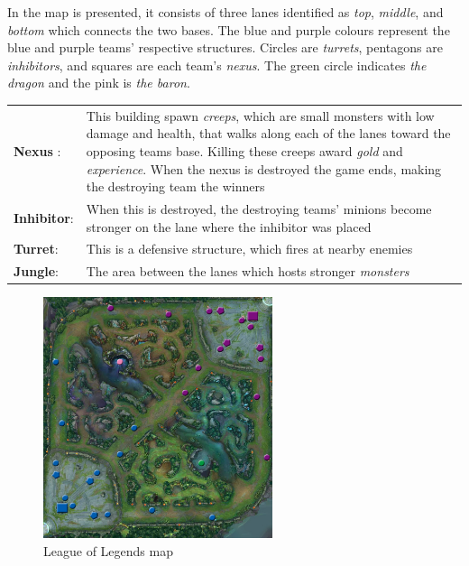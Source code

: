 In  the map is presented, it consists of three lanes identified as \emph{top}, \emph{middle}, and \emph{bottom} which connects the two bases. The blue and purple colours represent the blue and purple teams' respective structures. Circles are \emph{turrets}, pentagons are \emph{inhibitors}, and squares are each team's \emph{nexus}. The green circle indicates \emph{the dragon} and the pink is \emph{the baron}.

\begin{table}[!h]
  \begin{tabular}{l p{13cm}}
    \textbf{Nexus} : & This building spawn \emph{creeps}, which are small monsters with low damage and health, that walks along each of the lanes toward the opposing teams base. Killing these creeps award \emph{gold} and \emph{experience}. When the nexus is destroyed the game ends, making the destroying team the winners\\
    \textbf{Inhibitor}: & When this is destroyed, the destroying teams' minions become stronger on the lane where the inhibitor was placed\\
    \textbf{Turret}: & This is a defensive structure, which fires at nearby enemies\\
    \textbf{Jungle}: & The area between the lanes which hosts stronger \emph{monsters}\\
  \end{tabular}
\end{table}

\begin{figure}[!htb]
  \centering
    \includegraphics[width=0.6\textwidth]{img/lolmap.jpg}
  \caption{League of Legends map~\cite{lolmap}}\label{fig:lolmap}
\end{figure}

